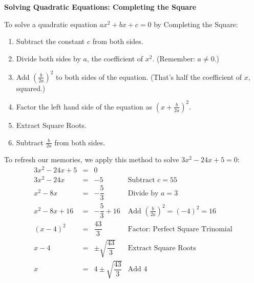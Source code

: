 \documentclass{ximera}
\begin{document}
{{\medskip

\label{completesquareeqns}

\colorbox{ResultColor}{\bbm

\centerline{\textbf{Solving Quadratic Equations:  Completing the Square}}
\vspace{0.05in}
To solve a quadratic equation $ax^2 + bx + c = 0$ by Completing the Square:

\begin{enumerate}

\item  Subtract the constant $c$ from both sides.
\item  Divide both sides by $a$,  the coefficient of $x^2$.  (Remember:  $a \neq 0$.)
\item  Add $\left(\frac{b}{2a}\right)^2$ to both sides of the equation. (That's half the coefficient of $x$, squared.)
\item  Factor the left hand side of the equation as $\left(x + \frac{b}{2a}\right)^2$.
\item  Extract Square Roots.
\item  Subtract $\frac{b}{2a}$ from both sides.

\end{enumerate}


\medskip

To refresh our memories, we apply this method to solve $3x^2 - 24x + 5 = 0$: \[ \begin{array}{rclr}

3x^2 - 24x + 5 & = & 0 & \\

3x^2 - 24x  & = & -5 & \text{Subtract  $c = 55$} \\

x^2 - 8x & = & -\dfrac{5}{3} & \text{Divide by $a = 3$} \\ [8pt]

x^2 - 8x + 16 & = & -\dfrac{5}{3} + 16 & \text{Add $\left(\frac{b}{2a}\right)^2 = (-4)^2 = 16$} \\ [8pt]

(x - 4)^2 & = & \dfrac{43}{3} & \text{Factor: Perfect Square Trinomial} \\

x - 4 & = & \pm \sqrt{\dfrac{43}{3}} & \text{Extract Square Roots} \\ [5pt]

x & = & 4 \pm \sqrt{\dfrac{43}{3}} & \text{Add $4$} \\


\end{array}\]}}}
\end{document}
